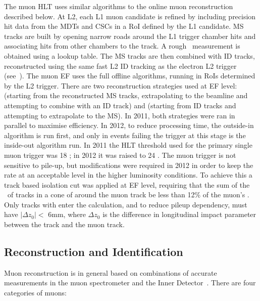 The muon HLT uses similar algorithms to the online muon reconstruction described
below. At L2, each L1 muon candidate is refined by including precision hit data
from the MDTs and CSCs in a RoI defined by the L1 candidate. MS tracks are
built by opening narrow roads around the L1 trigger chamber hits and associating
hits from other chambers to the track. A rough \pt\ measurement is obtained
using a lookup table. The MS tracks are then combined with ID tracks,
reconstructed using the same fast L2 ID tracking as the electron L2 trigger
(see~). The muon EF uses the full offline algorithms,
running in RoIs determined by the L2 trigger. There are two reconstruction
strategies used at EF level:  (starting from the reconstructed
MS tracks, extrapolating to the beamline and attempting to combine with an ID
track) and  (starting from ID tracks and attempting to
extrapolate to the MS). In 2011, both strategies were ran in parallel to
maximise efficiency. In 2012, to reduce processing time, the outside-in
algorithm is run first, and only in events failing the trigger at this stage is
the inside-out algorithm run. In 2011 the HLT threshold used for the primary
single muon trigger was 18 \GeV; in 2012 it was raised to 24 \GeV. The muon
trigger is not sensitive to pile-up, but modifications were required in 2012 in
order to keep the rate at an acceptable level in the higher luminosity
conditions. To achieve this a track based isolation cut was applied at EF level,
requiring that the sum of the \pt\ of tracks in a cone of  around
the muon track be less than 12\% of the muon's \pt. Only tracks with 
enter the calculation, and to reduce pileup dependency, must have $|\Delta
z_{0}| <$ 6mm, where $\Delta z_{0}$ is the difference in longitudinal impact
parameter between the track and the muon track.

\subsection{Reconstruction and Identification}
\label{sec:reco-mu-reco}

Muon reconstruction is in general based on combinations of accurate measurements
in the muon spectrometer and the Inner Detector~\cite{ATLAS-CONF-2010-064,ATLAS-CONF-2011-063}. There are four categories of
muons:

